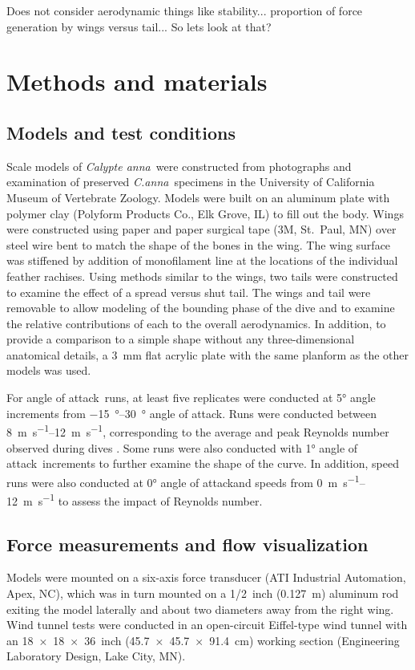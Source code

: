 \documentclass{rspublic}
\newcommand{\Calypteanna}{\emph{Calypte anna}}
\newcommand{\Canna}{\emph{C.\:anna}}
\newcommand{\aoa}{angle of attack}
\begin{document}
Does not consider aerodynamic things like stability... proportion of force generation by wings versus tail... So lets look at that? 

\section{Methods and materials}
\subsection{Models and test conditions}
Scale models of \Calypteanna\ were constructed from photographs and examination of preserved \Canna\ specimens in the University of California Museum of Vertebrate Zoology.  Models were built on an aluminum plate with polymer clay (Polyform Products Co., Elk Grove, IL) to fill out the body.  Wings were constructed using paper and paper surgical tape (3M, St.\ Paul, MN) over steel wire bent to match the shape of the bones in the wing.  The wing surface was stiffened by addition of monofilament line at the locations of the individual feather rachises.  Using methods similar to the wings, two tails were constructed to examine the effect of a spread versus shut tail.  The wings and tail were removable to allow modeling of the bounding phase of the dive and to examine the relative contributions of each to the overall aerodynamics.  In addition, to provide a comparison to a simple shape without any three-dimensional anatomical details, a \SI{3}{\milli\meter} flat acrylic plate with the same planform as the other models was used.  

For \aoa\ runs, at least five replicates were conducted at \ang{5} angle increments from \SIrange{-15}{30}{\degree} \aoa.  Runs were conducted between \SIrange{8}{12}{\meter\per\second}, corresponding to the average and peak Reynolds number observed during dives \citep{Clark:2009}.  Some runs were also conducted with \ang{1} \aoa\ increments to further examine the shape of the curve.  In addition, speed runs were also conducted at \ang{0} \aoa and speeds from \SIrange{0}{12}{\meter\per\second} to assess the impact of Reynolds number.

\subsection{Force measurements and flow visualization}
Models were mounted on a six-axis force transducer (ATI Industrial Automation, Apex, NC), which was in turn mounted on a \SI{1/2}{inch} (\SI{0.127}{\meter}) aluminum rod exiting the model laterally and about two diameters away from the right wing.  Wind tunnel tests were conducted in an open-circuit Eiffel-type wind tunnel with an \SI{18 x 18 x 36}{inch} (\SI{45.7 x 45.7 x 91.4}{\centi\meter}) working section (Engineering Laboratory Design, Lake City, MN).  
\end{document}
